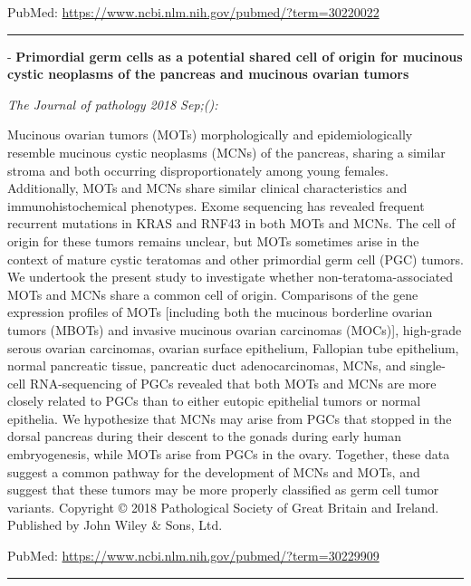 \documentclass[]{article}
\begin{document}
PubMed: \url{https://www.ncbi.nlm.nih.gov/pubmed/?term=30220022}

{}

{}

\begin{center}\rule{0.5\linewidth}{\linethickness}\end{center}

 - \textbf{Primordial germ cells as a potential shared cell of origin
for mucinous cystic neoplasms of the pancreas and mucinous ovarian
tumors}

\emph{The Journal of pathology 2018 Sep;():}

Mucinous ovarian tumors (MOTs) morphologically and epidemiologically
resemble mucinous cystic neoplasms (MCNs) of the pancreas, sharing a
similar stroma and both occurring disproportionately among young
females. Additionally, MOTs and MCNs share similar clinical
characteristics and immunohistochemical phenotypes. Exome sequencing has
revealed frequent recurrent mutations in KRAS and RNF43 in both MOTs and
MCNs. The cell of origin for these tumors remains unclear, but MOTs
sometimes arise in the context of mature cystic teratomas and other
primordial germ cell (PGC) tumors. We undertook the present study to
investigate whether non-teratoma-associated MOTs and MCNs share a common
cell of origin. Comparisons of the gene expression profiles of MOTs
{[}including both the mucinous borderline ovarian tumors (MBOTs) and
invasive mucinous ovarian carcinomas (MOCs){]}, high-grade serous
ovarian carcinomas, ovarian surface epithelium, Fallopian tube
epithelium, normal pancreatic tissue, pancreatic duct adenocarcinomas,
MCNs, and single-cell RNA-sequencing of PGCs revealed that both MOTs and
MCNs are more closely related to PGCs than to either eutopic epithelial
tumors or normal epithelia. We hypothesize that MCNs may arise from PGCs
that stopped in the dorsal pancreas during their descent to the gonads
during early human embryogenesis, while MOTs arise from PGCs in the
ovary. Together, these data suggest a common pathway for the development
of MCNs and MOTs, and suggest that these tumors may be more properly
classified as germ cell tumor variants. Copyright © 2018 Pathological
Society of Great Britain and Ireland. Published by John Wiley \& Sons,
Ltd.

PubMed: \url{https://www.ncbi.nlm.nih.gov/pubmed/?term=30229909}

{}

{}

\begin{center}\rule{0.5\linewidth}{\linethickness}\end{center}
\end{document}
